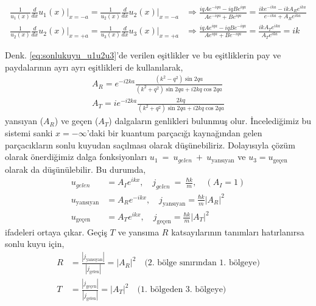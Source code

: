 \documentclass[00_kitap.tex]{subfiles}
\begin{document}
\begin{align}
\frac{1}{u_1(x)} \frac{d}{d x}u_1(x)\bigg|_{x=-a} = \frac{1}{u_2(x)} \frac{d}{d x}u_2(x)\bigg|_{x=-a}  &\Longrightarrow \frac{i q A e^{-i q a}-i q B e^{i q a}}{A e^{-i q a}+B e^{i q a}}=\frac{i k e^{-i k a}-i k A_R e^{i k a}}{e^{-i k a}+ A_R e^{i k a}} \nonumber\\
\frac{1}{u_2(x)} \frac{d}{d x}u_2(x)\bigg|_{x=+a} = \frac{1}{u_3(x)} \frac{d}{d x}u_3(x)\bigg|_{x=+a} &\Longrightarrow \frac{i q A e^{i q a}-i q B e^{-i q a}}{A e^{i q a}+B e^{-i q a}}=\frac{i k A_T e^{i k a}}{A_T e^{i k a}}=i k
\label{eq:sonlukuyu_u1u2u3}
\end{align}

Denk. \ref{eq:sonlukuyu_u1u2u3}'de verilen eşitlikler ve bu eşitliklerin pay ve paydalarının ayrı ayrı eşitlikleri de kullanılarak,
\begin{align}
{A_R= e^{-i 2 k a} \frac{\left(k^{2}-q^{2}\right) \sin 2 q a}{\left(k^{2}+q^{2}\right) \sin 2 q a + i 2 k q \cos 2 q a}} \\ 
{A_T= i e^{-i 2 k a} \frac{2 k q}{\left(k^{2}+q^{2}\right) \sin 2 q a + i 2 k q \cos 2 q a}}
\end{align}
yansıyan ($A_R$) ve geçen ($A_T$) dalgaların genlikleri bulunmuş olur. İncelediğimiz bu sistemi sanki $x = -\infty$'daki bir kuantum parçacığı kaynağından gelen parçacıkların sonlu kuyudan saçılması olarak düşünebiliriz. Dolayısıyla çözüm olarak önerdiğimiz dalga fonksiyonları $u_1~=~u_{gelen}~+~u_\text{yansıyan}$ ve $u_3 = u_\text{geçen}$ olarak da düşünülebilir. Bu durumda,
\begin{align}
u_{gelen} &= A_I e^{i k x}, \quad j_{gelen}~=~\frac{\hbar k} {m}, \quad (A_I = 1)\\
u_\text{yansıyan} &= A_R e^{-i k x}, \quad j_\text{yansıyan} = \frac{\hbar k} {m} |A_R|^2\\
u_\text{geçen} &= A_T e^{i k x}, \quad j_\text{geçen} = \frac{\hbar k} {m} |A_T|^2
\end{align}
ifadeleri ortaya çıkar. Geçiş $T$ ve yansıma $R$ katsayılarının tanımları hatırlanırsa sonlu kuyu için,
\begin{align}
R &= \frac{|j_\text{yansıyan}|}{|j_\text{gelen}|} = |A_R|^2 \quad \text{(2. bölge sınırından 1. bölgeye)}\\
T &= \frac{|j_\text{geçen}|}{|j_\text{gelen}|} = |A_T|^2  \quad \text{(1. bölgeden 3. bölgeye)}
\end{align}
\end{document}
